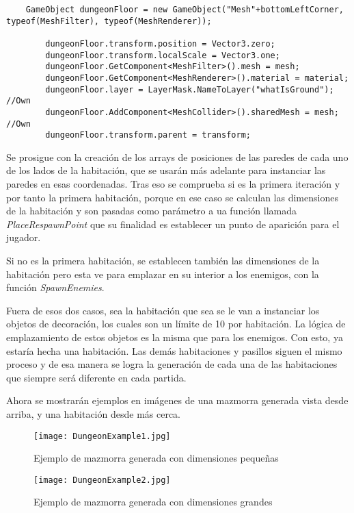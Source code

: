 \begin{lstlisting}
    GameObject dungeonFloor = new GameObject("Mesh"+bottomLeftCorner, typeof(MeshFilter), typeof(MeshRenderer));

        dungeonFloor.transform.position = Vector3.zero;
        dungeonFloor.transform.localScale = Vector3.one;
        dungeonFloor.GetComponent<MeshFilter>().mesh = mesh;
        dungeonFloor.GetComponent<MeshRenderer>().material = material;
        dungeonFloor.layer = LayerMask.NameToLayer("whatIsGround"); //Own
        dungeonFloor.AddComponent<MeshCollider>().sharedMesh = mesh; //Own
        dungeonFloor.transform.parent = transform;
\end{lstlisting}

Se prosigue con la creación de los arrays de posiciones de las paredes de cada uno de los lados de la habitación, que se usarán más adelante para instanciar las paredes en esas coordenadas. Tras eso se comprueba si es la primera iteración y por tanto la primera habitación, porque en ese caso se calculan las dimensiones de la habitación y son pasadas como parámetro a ua función llamada \textit{PlaceRespawnPoint} que su finalidad es establecer un punto de aparición para el jugador. 

Si no es la primera habitación, se establecen también las dimensiones de la habitación pero esta ve para emplazar en su interior a los enemigos, con la función \textit{SpawnEnemies}. 

Fuera de esos dos casos, sea la habitación que sea se le van a instanciar los objetos de decoración, los cuales son un límite de 10 por habitación. La lógica de emplazamiento de estos objetos es la misma que para los enemigos. Con esto, ya estaría hecha una habitación. Las demás habitaciones y pasillos siguen el mismo proceso y de esa manera se logra la generación de cada una de las habitaciones que siempre será diferente en cada partida.

Ahora se mostrarán ejemplos en imágenes de una mazmorra generada vista desde arriba, y una habitación desde más cerca.

\begin{figure}[H]
    \centering
    \texttt{[image: DungeonExample1.jpg]}
    \caption{Ejemplo de mazmorra generada con dimensiones pequeñas}
\end{figure}

\begin{figure}[H]
    \centering
    \texttt{[image: DungeonExample2.jpg]}
    \caption{Ejemplo de mazmorra generada con dimensiones grandes}
\end{figure}

